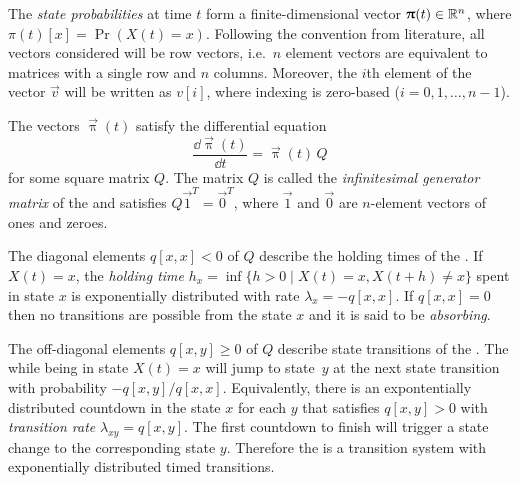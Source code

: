 The \emph{state probabilities} at time $t$ form a finite-dimensional vector \(\bm{\mathrm{\uppi}}(t) \in \mathbb{R}^n\), where \(\pi(t)[x] = \Pr(X(t) = x)\). Following the convention from  literature, all vectors considered will be row vectors, i.e.~\(n\) element vectors are equivalent to matrices with a single row and \(n\) columns. Moreover, the \(i\)th element of the vector \(\vec{v}\) will be written as \(v[i]\), where indexing is zero-based (\(i = 0, 1, \ldots, n - 1\)).

The vectors \(\vec{\uppi}(t)\) satisfy the differential equation
\begin{equation}
  \label{eq:background:ctmc-diffeq}
  \frac{\dd \vec{\uppi}(t)}{\dd t} = \vec{\uppi}(t) \, Q
\end{equation}
for some square matrix $Q$. The matrix $Q$ is called the \emph{infinitesimal generator matrix} of the  and satisfies \(Q \vec{1}^T = \vec{0}^T\), where \(\vec{1}\) and \(\vec{0}\) are \(n\)-element vectors of ones and zeroes.

The diagonal elements \(q[x, x] < 0\) of \(Q\) describe the holding times of the . If \(X(t) = x\), the \emph{holding time} \(h_x = \inf \{ h > 0 \mid X(t) = x, X(t + h) \ne x \}\) spent in state \(x\) is exponentially distributed with rate \(\lambda_x = -q[x, x]\). If \(q[x, x] = 0\) then no transitions are possible from the state $x$ and it is said to be \emph{absorbing}.

The off-diagonal elements \(q[x, y] \ge 0\) of \(Q\) describe state transitions of the . The  while being in state \(X(t) = x\) will jump to state~\(y\) at the next state transition with probability \(-q[x, y] / q[x, x]\). Equivalently, there is an expontentially distributed countdown in the state \(x\) for each \(y\) that satisfies \(q[x, y] > 0\) with \emph{transition rate} $\lambda_{xy} = q[x, y]$. The first countdown to finish will trigger a state change to the corresponding state \(y\). Therefore the  is a transition system with exponentially distributed timed transitions.

